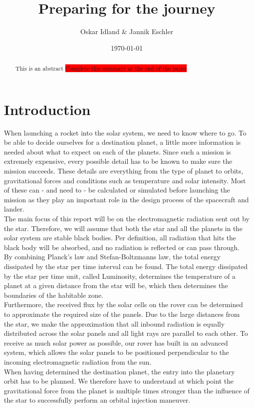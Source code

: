 \documentclass[reprint,english,notitlepage]{revtex4-2}
\begin{document}
\title{Preparing for the journey}
\author{Oskar Idland \& Jannik Eschler}
\date{\today}

\begin{abstract}
This is an abstract \colorbox{red}{Complete this summary at the end of the paper}
\end{abstract}
\maketitle

\section{Introduction} \label{sec:introduction}
When launching a rocket into the solar system, we need to know where to go.
To be able to decide ourselves for a destination planet, a little more information is needed about what to expect on each of the planets.
Since such a mission is extremely expensive, every possible detail has to be known to make sure the mission succeeds.
These details are everything from the type of planet to orbits, gravitational forces and conditions such as temperature and solar intensity.
Most of these can - and need to - be calculated or simulated before launching the mission as they play an important role in the design process of the spacecraft and lander.\\
The main focus of this report will be on the electromagnetic radiation sent out by the star.
Therefore, we will assume that both the star and all the planets in the solar system are stable black bodies.
Per definition, all radiation that hits the black body will be absorbed, and no radiation is reflected or can pass through.\\
By combining Planck's law and Stefan-Boltzmanns law, the total energy dissipated by the star per time interval can be found.
The total energy dissipated by the star per time unit, called Luminosity, determines the temperature of a planet at a given distance from the star will be, which then determines the boundaries of the habitable zone.\\
Furthermore, the received flux by the solar cells on the rover can be determined to approximate the required size of the panels.
Due to the large distances from the star, we make the approximation that all inbound radiation is equally distributed across the solar panels and all light rays are parallel to each other.
To receive as much solar power as possible, our rover has built in an advanced system, which allows the solar panels to be positioned perpendicular to the incoming electromagnetic radiation from the sun.\\
When having determined the destination planet, the entry into the planetary orbit has to be planned.
We therefore have to understand at which point the gravitational force from the planet is multiple times stronger than the influence of the star to successfully perform an orbital injection maneuver.
\end{document}
